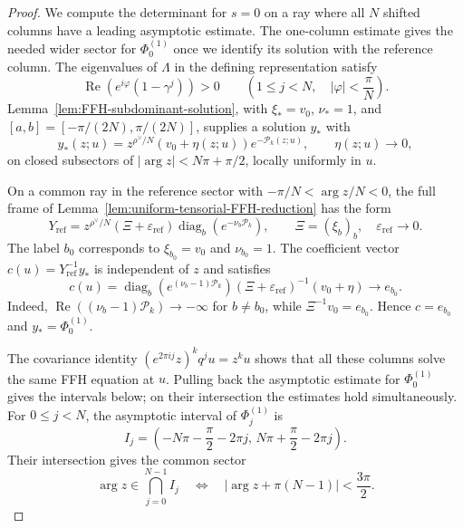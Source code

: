 \documentclass[11pt,leqno]{amsart}
\numberwithin{equation}{section}
\theoremstyle{plain}
\theoremstyle{definition}
\theoremstyle{plain}
\theoremstyle{definition}
\theoremstyle{remark}
\begin{document}
\begin{proof}
We compute the determinant for $s=0$ on a ray where all $N$ shifted columns have a leading asymptotic estimate.  The one-column estimate gives the needed wider sector for $\Phi_0^{(1)}$ once we identify its solution with the reference column.  The eigenvalues of $\Lambda$ in the defining representation satisfy
\[
 \operatorname{Re}\!\left(e^{i\varphi}(1-\gamma^j)\right)>0
 \qquad\left(1\le j<N,\quad |\varphi|<\frac\pi N\right).
\]
Lemma~\ref{lem:FFH-subdominant-solution}, with $\xi_*=v_0$, $\nu_*=1$, and $[a,b]=[-\pi/(2N),\pi/(2N)]$, supplies a solution $y_*$ with
\[
 y_*(z;u)=z^{\rho^\vee/N}(v_0+\eta(z;u))e^{-\mathcal P_k(z;u)},
 \qquad \eta(z;u)\longrightarrow0,
\]
on closed subsectors of $|\arg z|<N\pi+\pi/2$, locally uniformly in $u$.

On a common ray in the reference sector with $-\pi/N<\arg z/N<0$, the full frame of Lemma~\ref{lem:uniform-tensorial-FFH-reduction} has the form
\[
 Y_{\mathrm{ref}}
 =z^{\rho^\vee/N}(\Xi+\varepsilon_{\mathrm{ref}})
       \operatorname{diag}_b(e^{-\nu_b\mathcal P_k}),
 \qquad
 \Xi=(\xi_b)_b,\quad \varepsilon_{\mathrm{ref}}\longrightarrow0.
\]
The label $b_0$ corresponds to $\xi_{b_0}=v_0$ and $\nu_{b_0}=1$.  The coefficient vector $c(u)=Y_{\mathrm{ref}}^{-1}y_*$ is independent of $z$ and satisfies
\[
 c(u)=\operatorname{diag}_b\!\left(e^{(\nu_b-1)\mathcal P_k}\right)
       (\Xi+\varepsilon_{\mathrm{ref}})^{-1}(v_0+\eta)
       \longrightarrow e_{b_0}.
\]
Indeed, $\operatorname{Re}((\nu_b-1)\mathcal P_k)\to-\infty$ for $b\ne b_0$, while $\Xi^{-1}v_0=e_{b_0}$.  Hence $c=e_{b_0}$ and $y_*=\Phi_0^{(1)}$.

The covariance identity $(e^{2\pi ij}z)^kq^ju=z^ku$ shows that all these columns solve the same FFH equation at $u$.  Pulling back the asymptotic estimate for $\Phi_0^{(1)}$ gives the intervals below; on their intersection the estimates hold simultaneously.  For $0\le j<N$, the asymptotic interval of $\Phi_j^{(1)}$ is
\[
 I_j=\left(-N\pi-\frac\pi2-2\pi j,\,
             N\pi+\frac\pi2-2\pi j\right).
\]
Their intersection gives the common sector
\begin{equation}\label{eq:typeA-common-large-sector}
 \arg z\in\bigcap_{j=0}^{N-1}I_j
 \quad\Longleftrightarrow\quad
 \left|\arg z+\pi(N-1)\right|<\frac{3\pi}{2}.
\end{equation}


\end{proof}
\end{document}
